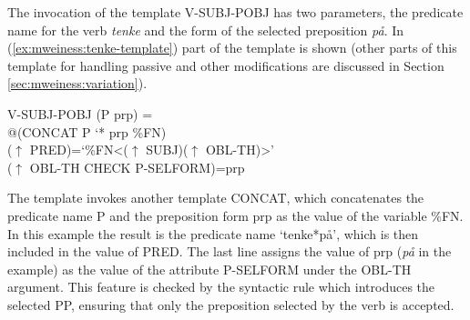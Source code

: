 \documentclass[output=paper]{langsci/langscibook}
\begin{document}
The invocation of the template V-SUBJ-POBJ has two parameters, the predicate name for the verb \textit{tenke} and the form of the selected preposition \textit{på}.
In (\ref{ex:mweiness:tenke-template}) part of the template is shown (other parts of this template for handling passive and other modifications are discussed in Section \ref{sec:mweiness:variation}).

\ea\label{ex:mweiness:tenke-template}
{\small 
V-SUBJ-POBJ (P prp) =\\
\hspace{2em} @(CONCAT P `* prp \%FN)\\
\hspace{2em}  ($\uparrow$ PRED)=`\%FN<($\uparrow$ SUBJ)($\uparrow$ OBL-TH)>'\\
\hspace{2em}  ($\uparrow$ OBL-TH CHECK P-SELFORM)=prp
}
\z

The template invokes another template CONCAT, which concatenates the pre\-dicate name P and the preposition form prp as the value of the variable \%FN.
In this example the result is the predicate name `tenke*på', which is then included in the value of PRED.
The last line assigns the value of prp (\textit{på} in the example) as the value of the attribute P-SELFORM under the OBL-TH argument.
This feature is checked by the syntactic rule which introduces the selected PP, ensuring that only the preposition selected by the verb is accepted.



\end{document}
